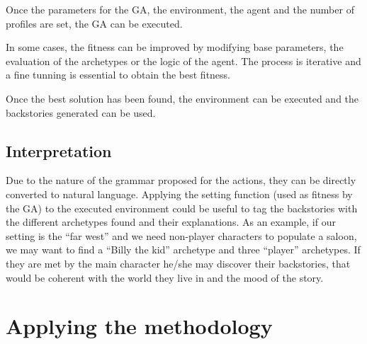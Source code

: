 \documentclass[letterpaper]{article}
\begin{document}
Once the parameters for the GA, the environment, the agent and the number of profiles are set, the GA can be executed.

In some cases, the fitness can be improved by modifying base parameters, the evaluation of the archetypes or the logic of the agent. The process is iterative and a fine tunning is essential to obtain the best fitness.

Once the best solution has been found, the environment can be executed and the backstories generated can be used.

\subsection{Interpretation}


Due to the nature of the grammar proposed for the actions, they can be directly converted to natural language. Applying the setting function (used as fitness by the GA) to the executed environment could be useful to tag the backstories with the different archetypes found and their explanations. As an example, if our setting is the ``far west'' and we need non-player characters to populate a saloon, we may want to find a ``Billy the kid'' archetype and three ``player'' archetypes. If they are met by the main character he/she may discover their backstories, that would be coherent with the world they live in and the mood of the story.




\section{Applying the methodology}
\label{sec:applying}
\end{document}
